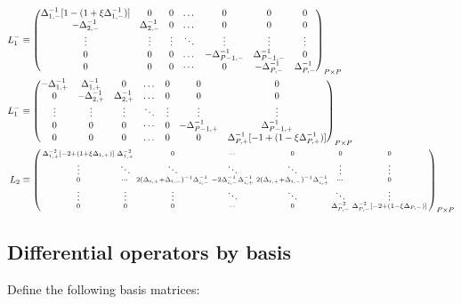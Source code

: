 \documentclass[11pt]{article}
\newenvironment{psmallmatrix}
{\left(\begin{smallmatrix}}
	{\end{smallmatrix}\right)}
\begin{document}
\begin{align}
L_1^{-} &\equiv \begin{pmatrix}
\Delta^{-1}_{1,-} [1 - (1 + \xi \Delta^{-1}_{1,-})] &0&0&\dots&0&0&0\\
-\Delta_{2,-}^{-1}&\Delta_{2,-}^{-1}&0&\dots&0&0&0\\
\vdots&\vdots&\vdots&\ddots&\vdots&\vdots&\vdots\\
0&0&0&\dots&-\Delta_{P-1,-}^{-1}&\Delta_{P-1,-}^{-1}&0\\
0&0&0&\cdots&0&-\Delta_{P,-}^{-1}&\Delta_{P,-}^{-1}
\end{pmatrix}_{P\times P}\label{eq:L-1} \\
L_1^{-} &\equiv \begin{pmatrix}
-\Delta_{1,+}^{-1}&\Delta_{1,+}^{-1}&0&\dots&0&0&0\\
0&-\Delta_{2,+}^{-1}&\Delta_{2,+}^{-1}&\dots&0&0&0\\
\vdots&\vdots&\vdots&\ddots&\vdots&\vdots&\vdots\\
0&0&0&\cdots&0&-\Delta_{P-1,+}^{-1}&\Delta_{P-1,+}^{-1}\\
0&0&0&\dots&0&0&\Delta_{P,+}^{-1}  [-1 + (1 - \xi \Delta^{-1}_{P,+})]  \\
\end{pmatrix}_{P\times P}\label{eq:L-1-plus} \\
L_2 &\equiv \begin{psmallmatrix}
\Delta_{1,+}^{-2}[-2 + (1+\xi \Delta_{1,+})] &\Delta_{1,+}^{-2}&0&\cdots&0&0&0 \\
\vdots&\ddots&\ddots&\ddots&\ddots&\vdots&\vdots\\
0&\cdots&2(\Delta_{i,+}+\Delta_{i,-})^{-1} \Delta_{i,-}^{-1} &-2\Delta_{i,-}^{-1} \Delta_{i,+}^{-1}  & 2 (\Delta_{i,+}+\Delta_{i,-})^{-1} \Delta_{i,+}^{-1}&\cdots&0 \\
\vdots&\vdots&\vdots&\ddots&\ddots&\ddots&\vdots\\
0&0&0&\cdots&0&\Delta_{P,-}^{-2}&\Delta_{P,-}^{-2} [-2 + (1- \xi\Delta_{P,-})]
\end{psmallmatrix}_{P\times P}\label{eq:L-2}
\end{align}

\subsection{Differential operators by basis}
Define the following basis matrices:
\end{document}
